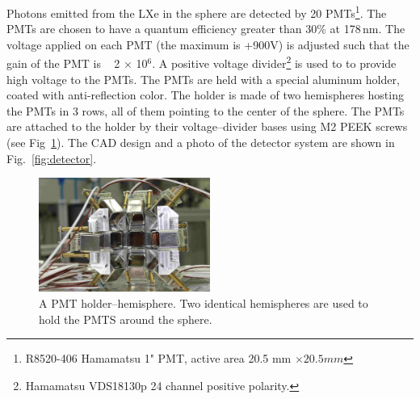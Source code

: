 Photons emitted from the LXe in the sphere are detected by 20  PMTs\footnote{R8520-406 Hamamatsu 1" PMT, active area 20.5 mm $\times 20.5 mm$}. 
The PMTs are chosen to have a quantum efficiency greater than 30\% at 178\,nm. The voltage applied on each PMT (the maximum is +900V) is adjusted such that the gain of the PMT is ~ 2 $\times$ 10$^6$. A positive voltage divider\footnote{Hamamatsu VDS18130p 24 channel positive polarity.} is used to to provide high voltage to the PMTs. 
The PMTs are held with a special aluminum holder, coated with anti-reflection color. 
The holder is made of two hemispheres hosting the PMTs in 3 rows, all of them pointing to the 
center of the sphere. The PMTs are attached to the holder by their voltage--divider bases using M2 PEEK screws (see Fig~\ref{fig:pmtholder}). 
The CAD design and a photo of the detector system are shown 
in Fig.~\ref{fig:detector}.

\begin{figure}[h]
   \centering
   \includegraphics[width=0.5\textwidth]{PMTholder.JPG}
   \caption{A PMT holder--hemisphere. Two identical hemispheres are used to hold the PMTS around the sphere.} 
   \label{fig:pmtholder}
\end{figure}

